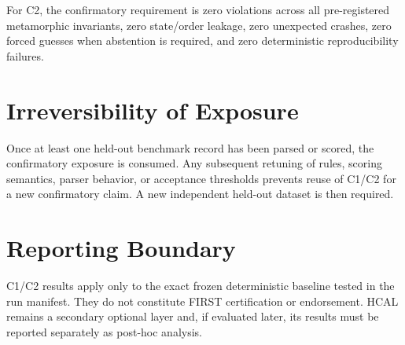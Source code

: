 For C2, the confirmatory requirement is zero violations across all
pre-registered metamorphic invariants, zero state/order leakage, zero
unexpected crashes, zero forced guesses when abstention is required, and zero
deterministic reproducibility failures.

\section{Irreversibility of Exposure}
Once at least one held-out benchmark record has been parsed or scored, the
confirmatory exposure is consumed. Any subsequent retuning of rules, scoring
semantics, parser behavior, or acceptance thresholds prevents reuse of C1/C2
for a new confirmatory claim. A new independent held-out dataset is then
required.

\section{Reporting Boundary}
C1/C2 results apply only to the exact frozen deterministic baseline tested in
the run manifest. They do not constitute FIRST certification or endorsement.
HCAL remains a secondary optional layer and, if evaluated later, its results
must be reported separately as post-hoc analysis.
